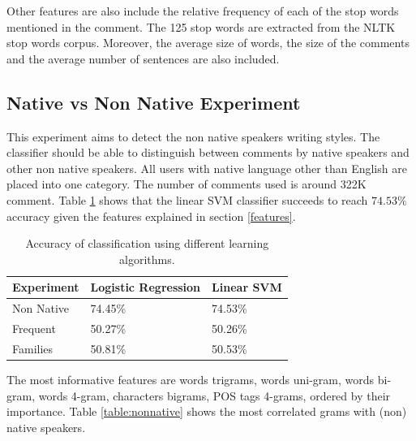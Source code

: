 \documentclass[10pt,a5paper,twoside]{article}
\begin{document}
Other features are also include the relative frequency of each of the stop words
mentioned in the comment. The 125 stop words are extracted from the NLTK stop
words corpus\cite{nltk}. Moreover, the average size of words, the size of the
comments and the average number of sentences are also included.

\subsection{Native vs Non Native Experiment}
\label{exps}
This experiment aims to detect the non native speakers writing styles. The
classifier should be able to distinguish between comments by native speakers
and other non native speakers.
All users with native language other than English are placed into one category.
The number of comments used is around 322K comment. Table
\ref{table:results} shows that the linear SVM classifier succeeds to reach
$74.53\%$ accuracy given the features explained in section \ref{features}.
\begin{table}
  \begin{center}
  \begin{tabular}{l|ll}
	Experiment & Logistic Regression & Linear SVM
	\\\hline
	Non Native & 74.45\% & 74.53\%\\
	Frequent & 50.27\% & 50.26\%\\
	Families & 50.81\% &50.53\% \\
\end{tabular}
\caption{Accuracy of classification using different learning algorithms.}
\label{table:results}
\end{center}
\end{table}

The most informative features are words trigrams, words uni-gram, words bi-gram,
words 4-gram, characters bigrams, POS tags 4-grams, ordered by their importance.
Table \ref{table:nonnative} shows the most correlated grams with (non) native
speakers.
\end{document}
